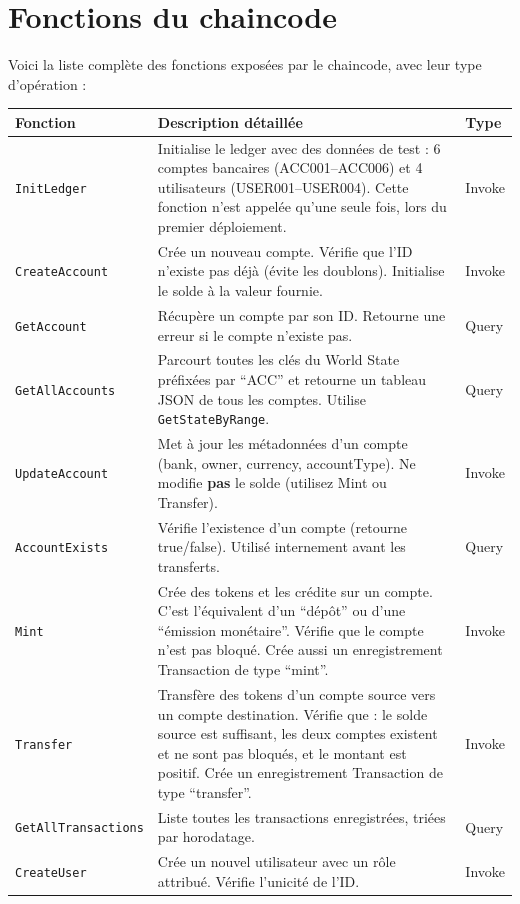 \documentclass[12pt,a4paper,twoside]{report}
\begin{document}
\section{Fonctions du chaincode}

Voici la liste complète des fonctions exposées par le chaincode, avec leur type d'opération :

\begin{longtable}{lp{7cm}l}
\toprule
\textbf{Fonction} & \textbf{Description détaillée} & \textbf{Type} \\
\midrule
\endhead
\texttt{InitLedger} & Initialise le ledger avec des données de test : 6 comptes bancaires (ACC001--ACC006) et 4 utilisateurs (USER001--USER004). Cette fonction n'est appelée qu'une seule fois, lors du premier déploiement. & Invoke \\
\texttt{CreateAccount} & Crée un nouveau compte. Vérifie que l'ID n'existe pas déjà (évite les doublons). Initialise le solde à la valeur fournie. & Invoke \\
\texttt{GetAccount} & Récupère un compte par son ID. Retourne une erreur si le compte n'existe pas. & Query \\
\texttt{GetAllAccounts} & Parcourt toutes les clés du World State préfixées par ``ACC'' et retourne un tableau JSON de tous les comptes. Utilise \texttt{GetStateByRange}. & Query \\
\texttt{UpdateAccount} & Met à jour les métadonnées d'un compte (bank, owner, currency, accountType). Ne modifie \textbf{pas} le solde (utilisez Mint ou Transfer). & Invoke \\
\texttt{AccountExists} & Vérifie l'existence d'un compte (retourne true/false). Utilisé internement avant les transferts. & Query \\
\texttt{Mint} & Crée des tokens et les crédite sur un compte. C'est l'équivalent d'un ``dépôt'' ou d'une ``émission monétaire''. Vérifie que le compte n'est pas bloqué. Crée aussi un enregistrement Transaction de type ``mint''. & Invoke \\
\texttt{Transfer} & Transfère des tokens d'un compte source vers un compte destination. Vérifie que : le solde source est suffisant, les deux comptes existent et ne sont pas bloqués, et le montant est positif. Crée un enregistrement Transaction de type ``transfer''. & Invoke \\
\texttt{GetAllTransactions} & Liste toutes les transactions enregistrées, triées par horodatage. & Query \\
\texttt{CreateUser} & Crée un nouvel utilisateur avec un rôle attribué. Vérifie l'unicité de l'ID. & Invoke \\

\end{longtable}
\end{document}
